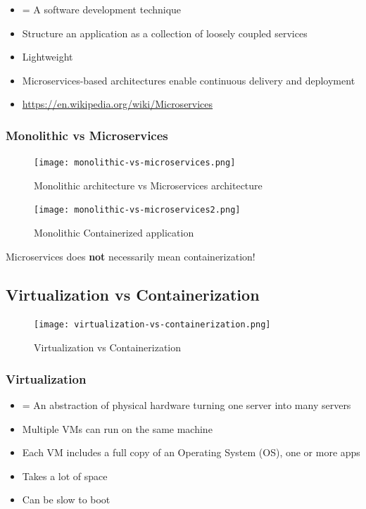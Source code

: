 \documentclass{article}
\newcommand{\bold}[1]{\textbf{#1}}
\begin{document}
\begin{itemize}
    \item = A software development technique
    \item Structure an application as a collection of loosely coupled services
    \item Lightweight
    \item Microservices-based architectures enable continuous delivery and deployment
    \item \url{https://en.wikipedia.org/wiki/Microservices}
\end{itemize}

\subsubsection{Monolithic vs Microservices}

\begin{figure}[H]
    \centering
    \texttt{[image: monolithic-vs-microservices.png]}
    \caption{Monolithic architecture vs Microservices architecture}
\end{figure}

\begin{figure}[H]
    \centering
    \texttt{[image: monolithic-vs-microservices2.png]}
    \caption{Monolithic Containerized application}
\end{figure}

Microservices does \bold{not} necessarily mean containerization!

\subsection{Virtualization vs Containerization}

\begin{figure}[H]
    \centering
    \texttt{[image: virtualization-vs-containerization.png]}
    \caption{Virtualization vs Containerization}
\end{figure}

\subsubsection{Virtualization}

\begin{itemize}
    \item = An abstraction of physical hardware turning one server into many servers
    \item Multiple VMs can run on the same machine
    \item Each VM includes a full copy of an Operating System (OS), one or more apps
    \item Takes a lot of space
    \item Can be slow to boot
\end{itemize}
\end{document}
